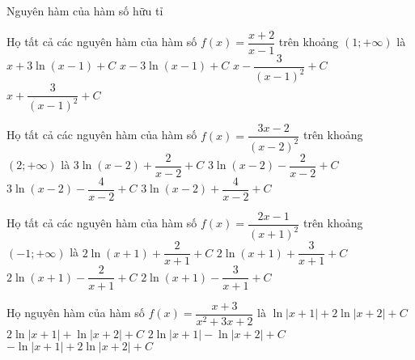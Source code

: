 \begin{dang}
	{Nguyên hàm của hàm số hữu tỉ}
\end{dang}
\begin{ex}
	Họ tất cả các nguyên hàm của hàm số $ f(x)=\dfrac{x+2}{x-1}$ trên khoảng $\left(1;+\infty\right)$ là
	\choice
	{\True $ x+3\ln \left(x-1\right)+C$}
	{$ x-3\ln \left(x-1\right)+C$}
	{$ x-\dfrac{3}{\left(x-1\right)^2}+C$}
	{$ x+\dfrac{3}{\left(x-1\right)^2}+C$}
\end{ex}
\begin{ex}
	[Mã đề 104 - BGD - 2019]%
	Họ tất cả các nguyên hàm của hàm số $ f(x)=\dfrac{3x-2}{\left(x-2\right)^2}$ trên khoảng $\left(2;+\infty\right)$ là
	\choice
	{$ 3\ln \left(x-2\right)+\dfrac{2}{x-2}+C$}
	{$ 3\ln \left(x-2\right)-\dfrac{2}{x-2}+C$}
	{\True $ 3\ln \left(x-2\right)-\dfrac{4}{x-2}+C$}
	{$ 3\ln \left(x-2\right)+\dfrac{4}{x-2}+C$}
\end{ex}
\begin{ex}
	[Mã đề 101 - BGD - 2019]%
	Họ tất cả các nguyên hàm của hàm số $ f(x)=\dfrac{2x-1}{\left(x+1\right)^2}$ trên khoảng$\left(-1;+\infty\right)$ là
	\choice
	{$ 2\ln \left(x+1\right)+\dfrac{2}{x+1}+C$}
	{\True $ 2\ln \left(x+1\right)+\dfrac{3}{x+1}+C$}
	{$ 2\ln \left(x+1\right)-\dfrac{2}{x+1}+C$}
	{$ 2\ln \left(x+1\right)-\dfrac{3}{x+1}+C$}
\end{ex}
\begin{ex}
	Họ nguyên hàm của hàm số $ f(x)=\dfrac{x+3}{x^2+3x+2}$ là
	\choice
	{$\ln \left| x+1\right|+2\ln \left| x+2\right|+C$}
	{$ 2\ln \left| x+1\right|+\ln \left| x+2\right|+C$}
	{\True $ 2\ln \left| x+1\right|-\ln \left| x+2\right|+C$}
	{$-\ln \left| x+1\right|+2\ln \left| x+2\right|+C$}
\end{ex}

